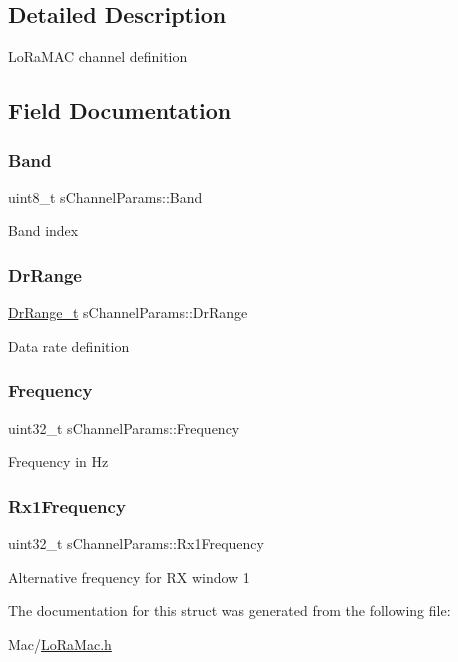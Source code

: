 \subsection{Detailed Description}
Lo\+Ra\+M\+AC channel definition 

\subsection{Field Documentation}
\mbox{\label{structsChannelParams_a10517040b4151537ba6cec7783576ce0}} 
\subsubsection{\texorpdfstring{Band}{Band}}
{\footnotesize\ttfamily uint8\+\_\+t s\+Channel\+Params\+::\+Band}

Band index \mbox{\label{structsChannelParams_a857777f73b0ad0bfd13e7b11d6bfa554}} 
\subsubsection{\texorpdfstring{Dr\+Range}{DrRange}}
{\footnotesize\ttfamily \hyperlink{group__LORAMAC_ga8b818a36013d6bdd83ac5fd20f42b503}{Dr\+Range\+\_\+t} s\+Channel\+Params\+::\+Dr\+Range}

Data rate definition \mbox{\label{structsChannelParams_a3fe5b74bdc28e6388d7e7432a44c39ca}} 
\subsubsection{\texorpdfstring{Frequency}{Frequency}}
{\footnotesize\ttfamily uint32\+\_\+t s\+Channel\+Params\+::\+Frequency}

Frequency in Hz \mbox{\label{structsChannelParams_aa8e9aa5d1a595128d8341fd53192dd00}} 
\subsubsection{\texorpdfstring{Rx1\+Frequency}{Rx1Frequency}}
{\footnotesize\ttfamily uint32\+\_\+t s\+Channel\+Params\+::\+Rx1\+Frequency}

Alternative frequency for RX window 1 

The documentation for this struct was generated from the following file\+:\begin{DoxyCompactItemize}
\item 
Mac/\hyperlink{LoRaMac_8h}{Lo\+Ra\+Mac.\+h}\end{DoxyCompactItemize}
